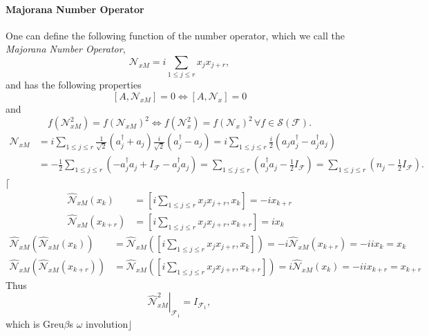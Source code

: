 \documentclass[aps,preprint]{revtex4}%
\begin{document}
\paragraph{Majorana Number Operator}

One can define the following function of the number operator, which we call
the \emph{Majorana Number Operator}, \emph{ }
\begin{equation}
\mathcal{N}_{xM}=i\sum_{1\leq j\leq r}x_{j}x_{j+r},
\end{equation}
and has the following properties
\begin{equation}
\left[  A,\mathcal{N}_{xM}\right]  =0\Longleftrightarrow\left[  A,\mathcal{N}%
_{x}\right]  =0
\end{equation}
and
\begin{equation}
f\left(  \mathcal{N}_{xM}^{2}\right)  =f\left(  \mathcal{N}_{xM}\right)
^{2}\Longleftrightarrow f\left(  \mathcal{N}_{x}^{2}\right)  =f\left(
\mathcal{N}_{x}\right)  ^{2}\,\forall f\in\mathcal{S}\left(  \mathcal{F}%
\right)  .
\end{equation}%
\begin{align}
\mathcal{N}_{xM} &  =i\sum_{1\leq j\leq r}\frac{1}{\sqrt{2}}\left(
a_{j}^{\dagger}+a_{j}\right)  \frac{i}{\sqrt{2}}\left(  a_{j}^{\dagger}%
-a_{j}\right)  =i\sum_{1\leq j\leq r}\frac{i}{2}\left(  a_{j}a_{j}^{\dagger
}-a_{j}^{\dagger}a_{j}\right)  \nonumber\\
&  =-\frac{1}{2}\sum_{1\leq j\leq r}\left(  -a_{j}^{\dagger}a_{j}%
+I_{\mathcal{F}}-a_{j}^{\dagger}a_{j}\right)  =\sum_{1\leq j\leq r}\left(
a_{j}^{\dagger}a_{j}-\frac{1}{2}I_{\mathcal{F}}\right)  =\sum_{1\leq j\leq
r}\left(  n_{j}-\frac{1}{2}I_{\mathcal{F}}\right)  .
\end{align}
$\lceil$%
\begin{align}
\widehat{\mathcal{N}}_{xM}\left(  x_{k}\right)   &  =\left[  i\sum_{1\leq
j\leq r}x_{j}x_{j+r},x_{k}\right]  =-ix_{k+r}\\
\widehat{\mathcal{N}}_{xM}\left(  x_{k+r}\right)   &  =\left[  i\sum_{1\leq
j\leq r}x_{j}x_{j+r},x_{k+r}\right]  =ix_{k}%
\end{align}%
\begin{align}
\widehat{\mathcal{N}}_{xM}\left(  \widehat{\mathcal{N}}_{xM}\left(
x_{k}\right)  \right)   &  =\widehat{\mathcal{N}}_{xM}\left(  \left[
i\sum_{1\leq j\leq r}x_{j}x_{j+r},x_{k}\right]  \right)
=-i\widehat{\mathcal{N}}_{xM}\left(  x_{k+r}\right)  =-iix_{k}=x_{k}\\
\widehat{\mathcal{N}}_{xM}\left(  \widehat{\mathcal{N}}_{xM}\left(
x_{k+r}\right)  \right)   &  =\widehat{\mathcal{N}}_{xM}\left(  \left[
i\sum_{1\leq j\leq r}x_{j}x_{j+r},x_{k+r}\right]  \right)
=i\widehat{\mathcal{N}}_{xM}\left(  x_{k}\right)  =-iix_{k+r}=x_{k+r}%
\end{align}
Thus
\begin{equation}
\left.  \widehat{\mathcal{N}}_{xM}^{2}\right\vert _{\mathcal{F}_{1}%
}=I_{\mathcal{F}_{1}},
\end{equation}
which is Greu$\beta$s $\omega$ involution$\rfloor$
\end{document}

